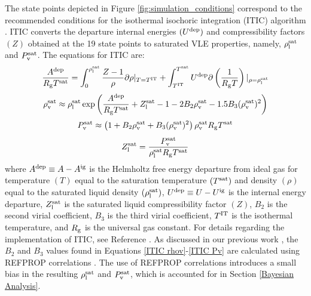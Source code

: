 \documentclass[journal=jctc,manuscript=article]{achemso}
\begin{document}
The state points depicted in Figure \ref{fig:simulation_conditions} correspond to the recommended conditions for the isothermal isochoric integration (ITIC) algorithm \cite{Mostafa_Diss,Postdoc_1}. 
ITIC converts the departure internal energies $(U^{\rm dep})$ and compressibility factors $(Z)$ obtained at the 19 state points to saturated VLE properties, namely, $\rho_{\rm l}^{\rm sat}$ and $P_{\rm v}^{\rm sat}$.
The 
equations for ITIC are: 
\begin{equation} \label{ITIC A}
\frac{A^{\rm dep}}{R_{\rm g}T^{\rm sat}} = \int_{0}^{\rho_{\rm l}^{\rm sat}}\frac{Z-1}{\rho} \partial \rho |_{T = T^{\rm IT}} + \int_{T^{\rm IT}}^{T^{\rm sat}}U^{\rm dep}\partial\left(\frac{1}{R_{\rm g}T}\right)|_{\rho=\rho_{\rm l}^{\rm sat}}
\end{equation}
\begin{equation} \label{ITIC rhov}
\rho_{\rm v}^{\rm sat} \approx \rho_{\rm l}^{\rm sat} \exp \left( \frac{A^{\rm dep}}{R_{\rm g}T^{\rm sat}} + Z_{\rm l}^{\rm sat} - 1 - 2 B_2 \rho_{\rm v}^{\rm sat} - 1.5 B_3 (\rho_{\rm v}^{\rm sat})^2 \right)
\end{equation}
\begin{equation} \label{ITIC Pv}
P_{\rm v}^{\rm sat} \approx \left(1 + B_2 \rho_{\rm v}^{\rm sat} + B_3 (\rho_{\rm v}^{\rm sat})^2\right)\rho_{\rm v}^{\rm sat} R_{\rm g}T^{\rm sat}
\end{equation}
\begin{equation} \label{ITIC Zl}
Z_{\rm l}^{\rm sat} = \frac{P_{\rm v}^{\rm sat}}{\rho_{\rm l}^{\rm sat} R_{\rm g} T^{\rm sat}}
\end{equation}
where $A^{\rm dep} \equiv A-A^{\rm ig}$ is the Helmholtz free energy departure from ideal gas for temperature $(T)$ equal to the saturation temperature $(T^{\rm sat})$ and density $(\rho)$ equal to the saturated liquid density $(\rho_{\rm l}^{\rm sat})$, $U^{\rm dep} \equiv U-U^{\rm ig}$ is the internal energy departure, $Z_{\rm l}^{\rm sat}$ is the saturated liquid compressibility factor $(Z)$, $B_2$ is the second virial coefficient, $B_3$ is the third virial coefficient, $T^{\rm IT}$ is the isothermal temperature, and $R_{\rm g}$ is the universal gas constant. For details regarding the implementation of ITIC, see Reference \cite{Postdoc_1}. As discussed in our previous work \cite{Postdoc_1}, the $B_2$ and $B_3$ values found in Equations \ref{ITIC rhov}-\ref{ITIC Pv} are calculated using REFPROP correlations . The use of REFPROP correlations introduces a small bias in the resulting $\rho_{\rm l}^{\rm sat}$ and $P_{\rm v}^{\rm sat}$, which is accounted for in Section \ref{Bayesian Analysis}.   
\end{document}
